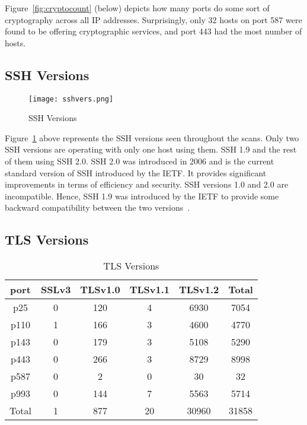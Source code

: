 \noindent Figure~\ref{fig:cryptocount} (below) depicts how many ports do some sort of cryptography across all IP addresses. Surprisingly, only 32 hosts on port 587 were found 
to be offering cryptographic services, and port 443 had the most number of hosts.
\subsection{SSH Versions}
\begin{figure}[h!]
    \centering
    \texttt{[image: sshvers.png]}
    \caption{SSH Versions}
    \label{fig:sshvers}
\end{figure}
\noindent Figure~\ref{fig:sshvers} above represents the SSH versions seen throughout the scans. Only two SSH versions are operating with only one host using them. 
SSH 1.9 and the rest of them using SSH 2.0. SSH 2.0 was introduced in 2006 and is the current standard version of SSH introduced by the IETF.
It provides significant improvements in terms of efficiency and security. SSH versions 1.0 and 2.0 are incompatible. Hence, SSH 1.9 was introduced by 
the IETF to provide some backward compatibility between the two versions~\cite{rfc4253}. 
\newpage

\subsection{TLS Versions}
\begin{table}[h!]
    \centering
    \begin{tabular}{|c|c|c|c|c|c|}
        \hline
        port  & SSLv3 & TLSv1.0 & TLSv1.1 & TLSv1.2 & Total  \\ \hline
        p25 & 0 & 120 & 4 & 6930 & 7054 \\ \hline
        p110 & 1 & 166 & 3 & 4600 & 4770 \\ \hline
        p143 & 0 & 179 & 3 & 5108 & 5290 \\ \hline
        p443 & 0 & 266 & 3 & 8729 & 8998 \\ \hline
        p587 & 0 & 2 & 0 & 30 & 32 \\ \hline
        p993 & 0 & 144 & 7 & 5563 & 5714 \\ \hline
        Total  & 1 & 877 & 20 & 30960 & 31858 \\ \hline
    \end{tabular}
    \caption{TLS Versions}
    \label{table:tlsvers}
\end{table}


